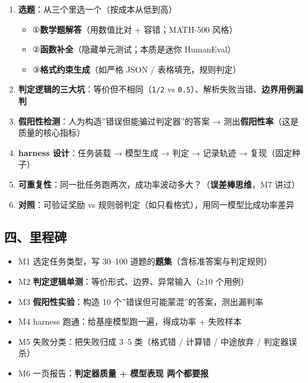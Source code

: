\documentclass[
  chinese,
  11pt,
]{ctexart}
\providecommand{\tightlist}{%
  \setlength{\itemsep}{0pt}\setlength{\parskip}{0pt}}
\begin{document}
\begin{enumerate}
\def\labelenumi{\arabic{enumi}.}
\tightlist
\item
  \textbf{选题}：从三个里选一个（按成本从低到高）

  \begin{itemize}
  \tightlist
  \item
    ①\textbf{数学题解答}（用数值比对 + 容错；MATH-500 风格）
  \item
    ②\textbf{函数补全}（隐藏单元测试；本质是迷你 HumanEval）
  \item
    ③\textbf{格式约束生成}（如严格 JSON / 表格填充，规则判定）
  \end{itemize}
\item
  \textbf{判定逻辑的三大坑}：等价但不相同（\texttt{1/2} vs \texttt{0.5}）、解析失败当错、\textbf{边界用例漏判}
\item
  \textbf{假阳性检测}：人为构造''错误但能骗过判定器''的答案 → 测出\textbf{假阳性率}（这是质量的核心指标）
\item
  \textbf{harness 设计}：任务装载 → 模型生成 → 判定 → 记录轨迹 → 复现（固定种子）
\item
  \textbf{可重复性}：同一批任务跑两次，成功率波动多大？（\textbf{误差棒思维}，M7 讲过）
\item
  \textbf{对照}：可验证奖励 vs 规则弱判定（如只看格式），用同一模型比成功率差异
\end{enumerate}

\subsection{四、里程碑}\label{ux56dbux91ccux7a0bux7891}

\begin{itemize}
\tightlist
\item[$\square$]
  M1 选定任务类型，写 30--100 道题的\textbf{题集}（含标准答案与判定规则）
\item[$\square$]
  M2 \textbf{判定逻辑单测}：等价形式、边界、异常输入（≥10 个用例）
\item[$\square$]
  M3 \textbf{假阳性实验}：构造 10 个''错误但可能蒙混''的答案，测出漏判率
\item[$\square$]
  M4 harness 跑通：给基座模型跑一遍，得成功率 + 失败样本
\item[$\square$]
  M5 失败分类：把失败归成 3--5 类（格式错 / 计算错 / 中途放弃 / 判定器误杀）
\item[$\square$]
  M6 一页报告：\textbf{判定器质量 + 模型表现 两个都要报}
\end{itemize}
\end{document}
